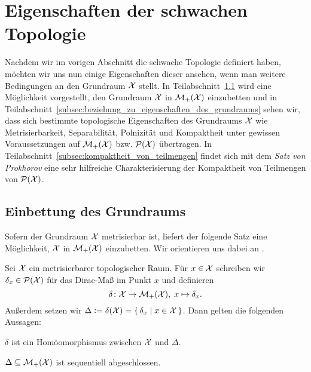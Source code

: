 \documentclass[../main/main.tex]{subfiles}
\begin{document}
	
	\section{Eigenschaften der schwachen Topologie}
	\label{sec:eigenschaften_der_schwachen_topologie}
	
	Nachdem wir im vorigen Abschnitt die schwache Topologie definiert haben, möchten wir uns nun einige Eigenschaften dieser ansehen, wenn man weitere Bedingungen an den Grundraum $\mathcal{X}$ stellt. 
	In Teilabschnitt~\ref{subsec:einbettung_des_grundraums} wird eine Möglichkeit vorgestellt, den Grundraum $\mathcal{X}$ in $\mathcal{M}_{+}(\mathcal{X})$ einzubetten und in Teilabschnitt~\ref{subsec:beziehung_zu_eigenschaften_des_grundraums} sehen wir, dass sich bestimmte topologische Eigenschaften des Grundraums $\mathcal{X}$ wie 
	Metrisierbarkeit, Separabilität, Polnizität und Kompaktheit unter gewissen Voraussetzungen auf $\mathcal{M}_{+}(\mathcal{X})$ bzw. $\mathcal{P}(\mathcal{X})$ übertragen.
	In Teilabschnitt~\ref{subsec:kompaktheit_von_teilmengen} findet sich mit dem \emph{Satz von Prokhorov} eine sehr hilfreiche Charakterisierung der Kompaktheit von Teilmengen von $\mathcal{P}(\mathcal{X})$.
	
	\subsection{Einbettung des Grundraums}
	\label{subsec:einbettung_des_grundraums}
	
	Sofern der Grundraum $\mathcal{X}$ metrisierbar ist, liefert der folgende Satz eine Möglichkeit, $\mathcal{X}$ in $\mathcal{M}_{+}(\mathcal{X})$ einzubetten. 
	Wir orientieren uns dabei an \cite[Hilfssätze 3.2 und 3.3]{Varadarajan.1958}.
	
	\begin{Satz}
		\label{satz:einbettung_des_grundraums}
		Sei $\mathcal{X}$ ein metrisierbarer topologischer Raum. Für $x \in \mathcal{X}$ schreiben wir $\delta_x \in \mathcal{P}(\mathcal{X})$ für das Dirac-Maß im Punkt $x$ und definieren
		\[ \delta \colon \mathcal{X} \to \mathcal{M}_{+}(\mathcal{X}), \; x \mapsto \delta_x  \text{.} \]
		Außerdem setzen wir $\Delta \vcentcolon = \delta(\mathcal{X}) = \left\{\, \delta_x \; \middle| \; x \in \mathcal{X} \,\right\}$. Dann gelten die folgenden Aussagen:
		\begin{enumeratethm}
			\item $\delta$ ist ein Homöomorphismus zwischen $\mathcal{X}$ und $\Delta$.
			\item $\Delta \subseteq \mathcal{M}_{+}(\mathcal{X})$ ist sequentiell abgeschlossen.
		\end{enumeratethm}
	\end{Satz}
\end{document}
